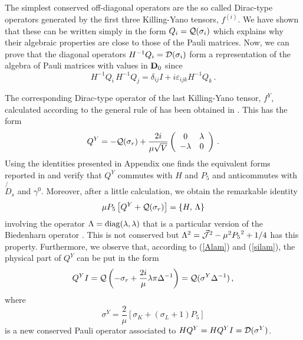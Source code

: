 \documentclass[a4paper,12pt]{article}
\begin{document}
The simplest conserved off-diagonal operators  are the so called 
Dirac-type operators  generated by the first three Killing-Yano tensors, 
$f^{(i)}$. We have shown  \cite{CV2,CV3} that these can be written simply 
in the form $Q_{i}={\cal Q}(\sigma_{i})$ which explains why their 
algebraic properties are close to those of the Pauli matrices. Now, we 
can prove that the diagonal operators $H^{-1}Q_{i}={\cal D}(\sigma_{i})$  
form a representation of the algebra of Pauli matrices with values in 
${\bf D}_{0}$ since
\begin{equation}
H^{-1}Q_{i}\,H^{-1}Q_{j}=\delta_{ij}I+i\varepsilon_{ijk}H^{-1}Q_{k}\,.
\end{equation}


The corresponding Dirac-type operator of the last Killing-Yano tensor, 
$f^Y$, calculated  according to the general rule of \cite{CML} has been 
obtained in \cite{CV3}.  This has the form
\begin{equation}\label{dy1}
Q^Y=-{\cal Q}(\sigma_r)
+\frac{2i}{\mu\sqrt{V}}\left(
\begin{array}{cc}
0&\lambda\\
-\lambda&0
\end{array}
\right)\,.
\end{equation}
Using the identities presented in Appendix one finds the equivalent forms 
reported in \cite{CV3}  and verify that $Q^Y$ commutes with $H$ and 
$P_{5}$ and anticommutes with $\not{\!\!D}_s$ and $\gamma^0$. Moreover, 
after a little calculation,  we obtain the remarkable identity
\begin{equation}
\mu P_{5}\left[Q^{Y}+ {\cal Q}(\sigma_r)\right]=\left\{H,\,\Lambda\right\}
\end{equation}
involving the operator $\Lambda={\rm diag}(\lambda,\lambda)$ that is a 
particular version of the Biedenharn operator  \cite{BID}. This is not 
conserved but 
$\Lambda^{2}=\vec{{\cal J}}^2-\mu^{2}{P_{5}}^{2}+1/4$ has this property.
Furthermore, we observe that, according to (\ref{Alam}) and 
(\ref{silam}), the physical part of $Q^Y$  can be put in the form 
\begin{equation}
Q^{Y}I={\cal Q}\left(-\sigma_{r}+\frac{2i}{\mu}\lambda\pi\Delta^{-1}\right)
={\cal Q}(\sigma^{Y}\Delta^{-1}) \,,
\end{equation}
where
\begin{equation}
\sigma^{Y}=\frac{2}{\mu}\left[\sigma_{K}+(\sigma_{L}+1)P_{5}\right]
\end{equation} 
is a new conserved Pauli operator  associated to $H Q^{Y}=H Q^{Y}I= 
{\cal D}(\sigma^{Y})$.   
\end{document}

